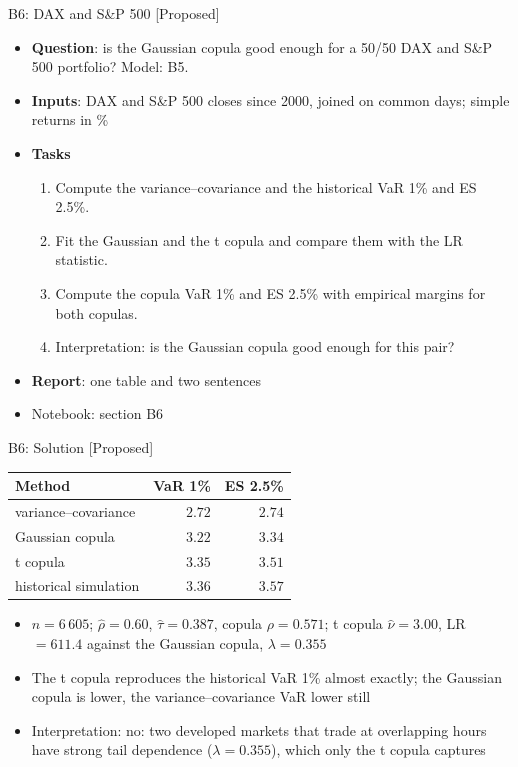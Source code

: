 \begin{frame}{B6: DAX and S\&P 500 [Proposed]}
\itemsize{\footnotesize}
\begin{itemize}
\item \textbf{Question}: is the Gaussian copula good enough for a 50/50 DAX and S\&P 500 portfolio? Model: B5.
\item \textbf{Inputs}: DAX and S\&P 500 closes since 2000, joined on common days; simple returns in \%
\item \textbf{Tasks}
\begin{enumerate}
    \item Compute the variance--covariance and the historical VaR 1\% and ES 2.5\%.
    \item Fit the Gaussian and the t copula and compare them with the LR statistic.
    \item Compute the copula VaR 1\% and ES 2.5\% with empirical margins for both copulas.
    \item Interpretation: is the Gaussian copula good enough for this pair?
\end{enumerate}
\item \textbf{Report}: one table and two sentences
\item Notebook: section B6
\end{itemize}
\end{frame}

\ifsolutions
\begin{frame}{B6: Solution [Proposed]}
\itemsize{\footnotesize}
\begin{center}
\footnotesize
\begin{tabular}{lrr}
\toprule
Method & VaR 1\% & ES 2.5\% \\
\midrule
variance--covariance & $2.72$ & $2.74$ \\
Gaussian copula & $3.22$ & $3.34$ \\
t copula & $3.35$ & $3.51$ \\
historical simulation & $3.36$ & $3.57$ \\
\bottomrule
\end{tabular}
\end{center}
\begin{itemize}
    \item $n = 6\,605$; $\hat\rho = 0.60$, $\hat\tau = 0.387$, copula $\rho = 0.571$; t copula $\hat\nu = 3.00$, LR $= 611.4$ against the Gaussian copula, $\lambda = 0.355$
    \item The t copula reproduces the historical VaR 1\% almost exactly; the Gaussian copula is lower, the variance--covariance VaR lower still
    \item Interpretation: no: two developed markets that trade at overlapping hours have strong tail dependence ($\lambda = 0.355$), which only the t copula captures
\end{itemize}
\end{frame}
\fi



